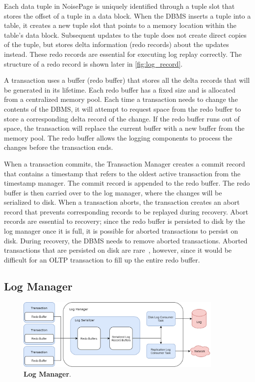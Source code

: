 \documentclass[12pt]{cmuthesis}
\begin{document}
Each data tuple in NoisePage is uniquely identified through a tuple slot that stores the offset of a tuple in a data block. When the DBMS inserts a tuple into a table, it creates a new tuple slot that points to a memory location within the table's data block. Subsequent updates to the tuple does not create direct copies of the tuple, but stores delta information (redo records) about the updates instead. These redo records are essential for executing log replay correctly. The structure of a redo record is shown later in \cref{fig:log_record}.

A transaction uses a buffer (redo buffer) that stores all the delta records that will be generated in its lifetime. Each redo buffer has a fixed size and is allocated from a centralized memory pool. Each time a transaction needs to change the contents of the DBMS, it will attempt to request space from the redo buffer to store a corresponding delta record of the change. If the redo buffer runs out of space, the transaction will replace the current buffer with a new buffer from the memory pool. The redo buffer allows the logging components to process the changes before the transaction ends.

When a transaction commits, the Transaction Manager creates a commit record that contains a timestamp that refers to the oldest active transaction from the timestamp manager. The commit record is appended to the redo buffer. The redo buffer is then carried over to the log manager, where the changes will be serialized to disk. When a transaction aborts, the transaction creates an abort record that prevents corresponding records to be replayed during recovery. Abort records are essential to recovery; since the redo buffer is persisted to disk by the log manager once it is full, it is possible for aborted transactions to persist on disk. During recovery, the DBMS needs to remove aborted transactions. Aborted transactions that are persisted on disk are rare~\cite{tpc15}, however, since it would be difficult for an OLTP transaction to fill up the entire redo buffer.

\subsection{Log Manager}
\begin{figure}[t!]
\centering
\includegraphics[width=0.9\textwidth]{images/WAL.png}
\caption{\textbf{Log Manager}.}
\label{fig:log_manager}
\end{figure}
\end{document}
